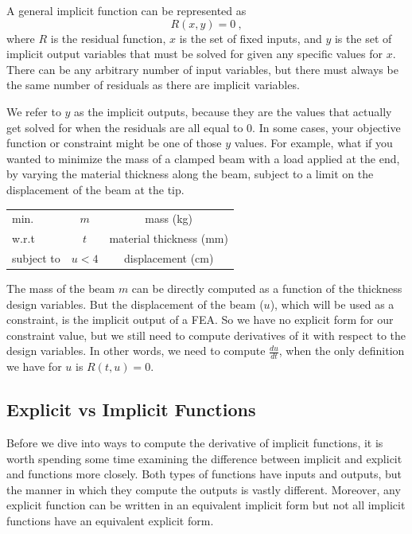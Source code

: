 \documentclass[conf]{new-aiaa}
\begin{document}
    A general implicit function can be represented as 
    \begin{equation}
        R(x,y) = 0 \ , 
    \end{equation}
    where $R$ is the residual function, $x$ is the set of fixed inputs, and $y$ is the set of implicit output variables that must be solved for given any specific values for $x$. 
    There can be any arbitrary number of input variables, but there must always be the same number of residuals as there are implicit variables. 

    We refer to $y$ as the implicit outputs, because they are the values that actually get solved for when the residuals are all equal to 0.
    In some cases, your objective function or constraint might be one of those $y$ values. 
    For example, what if you wanted to minimize the mass of a clamped beam with a load applied at the end, by varying the material thickness along the beam, subject to a limit on the displacement of the beam at the tip. 
    \begin{table}[H]
        \centering
        \begin{tabular}{lcc}
            \hline
            min. & $m$ & mass (kg)\\
            w.r.t & $t$ & material thickness (mm) \\ 
            subject to & $u < 4$ & displacement (cm)\\ \hline
        \end{tabular}
    \end{table}
    The mass of the beam $m$ can be directly computed as a function of the thickness design variables. 
    But the displacement of the beam ($u$), which will be used as a constraint, is the implicit output of a FEA. 
    So we have no explicit form for our constraint value, but we still need to compute derivatives of it with respect to the design variables. 
    In other words, we need to compute $\frac{du}{dt}$, when the only definition we have for $u$ is $R(t,u)=0$.

    \subsection{Explicit vs Implicit Functions}
    Before we dive into ways to compute the derivative of implicit functions, it is worth spending some time examining the difference between implicit and explicit and functions more closely. 
    Both types of functions have inputs and outputs, but the manner in which they compute the outputs is vastly different. 
    Moreover, any explicit function can be written in an equivalent implicit form but not all implicit functions have an equivalent explicit form. 
\end{document}
